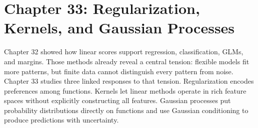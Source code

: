 \section{Chapter 33: Regularization, Kernels, and Gaussian Processes}
\label{ch:regularization-kernels-gaussian-processes}

Chapter 32 showed how linear scores support regression, classification, GLMs, and margins. Those methods already reveal a central tension: flexible models fit more patterns, but finite data cannot distinguish every pattern from noise. Chapter 33 studies three linked responses to that tension. Regularization encodes preferences among functions. Kernels let linear methods operate in rich feature spaces without explicitly constructing all features. Gaussian processes put probability distributions directly on functions and use Gaussian conditioning to produce predictions with uncertainty.

